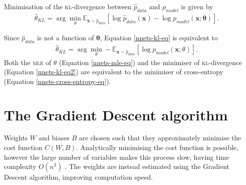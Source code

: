 Minimisation of the \textsc{kl}-divergence between $\hat{p}_{data}$ and $p_{model}$ is given by
\begin{align}\label{nnets-kl-eq}
	\hat{\theta}_{KL} = \arg\min_\theta\mathbb{E}_{\mathbf{x}\sim\hat{p}_{data}}\left[\log \hat{p}_{data}(\mathbf{x}) - \log p_{model}(\mathbf{x};\mathbf{\theta})\right].
\end{align}

Since $\hat{p}_{data}$ is not a function of $\mathbf{\theta}$, Equation \eqref{nnets-kl-eq} is equivalent to 
\begin{align}\label{nnets-kl-eq2}
	\hat\theta_{KL} = \arg\min_\theta-\mathbb{E}_{\mathbf{x}\sim\hat{p}_{data}}\left[\log p_{model}(\mathbf{x};\theta)\right].
\end{align}
Both the \textsc{mle} of $\theta$ (Equation \eqref{nnets-mle-eq}) and the minimiser of \textsc{kl}-divergence (Equation \eqref{nnets-kl-eq2}) are equivalent to the minimiser of cross-entropy (Equation \eqref{nnets-cross-entropy-eq}). 






\section{The Gradient Descent algorithm}\label{nnets-graddesc}

Weights $W$ and biases $B$ are chosen such that they approximately minimise the cost function $C(W,B)$. Analytically minimising the cost function is possible, however the large number of variables makes this process slow, having time complexity $O(n^3)$ \cite{Marquardt1963}. The weights are instead estimated using the Gradient Descent algorithm, improving computation speed.

